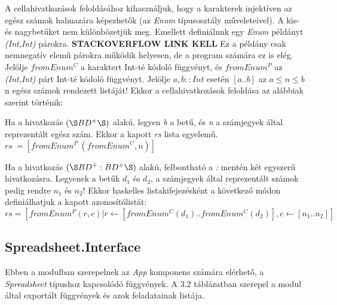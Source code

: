 A cellahivatkozások feloldásához kihasználjuk, hogy a karakterek injektíven az egész számok halmazára képezhetők (az \textit{Enum} típusosztály műveleteivel). A kis- és nagybetűket nem különbözetjük meg. Emellett definiálunk egy \textit{Enum} példányt \textit{(Int,Int)} párokra. \textbf{STACKOVERFLOW LINK KELL} Ez a példány csak nemnegatív elemű párokra működik helyesen, de a program számára ez is elég. Jelölje $fromEnum^C$ a karaktert Int-té kódoló függvényt, és $fromEnum^P$ az \textit{(Int,Int)} párt Int-té kódoló függvényt. Jelölje $a,b :: Int$ esetén $[a..b]$ az $a \le n \le b$ n egész számok rendezett listáját! Ekkor a cellahivatkozások feloldása az alábbiak szerint történik:
\begin{compactenum}
	\item Ha a hivatkozás $(\S BD^+\S )$ alakú, legyen \textit{b} a betű, és \textit{n} a számjegyek által reprezentált egész szám. Ekkor a kapott  \textit{rs} lista egyelemű. $rs\ = [fromEnum^P\ (fromEnum^C,n)]$
	\item Ha a hivatkozás $(\S  BD^+:BD^+\S )$ alakú, felbontható a \textit{:} mentén két egyszerű hivatkozásra. Legyenek a betűk $d_1$ és $d_2$, a számjegyek által reprezentált számok pedig rendre $n_1$ és $n_2$! Ekkor haskelles listakifejezésként a következő módon definiálhatjuk a kapott azonosítólistát:	\mbox{$rs = [fromEnum^P (r,c) | r \leftarrow [fromEnum^C(d_1)..fromEnum^C(d_2)], c \leftarrow [n_1..n_2]]$}

\end{compactenum}

\subsection{Spreadsheet.Interface}

Ebben a modulban szerepelnek az \textit{App} komponens számára elérhető, a \textit{Spreadsheet} típushoz kapcsolódó függvények. A 3.2 táblázatban szerepel a modul által exportált függvények és azok feladatainak listája.

